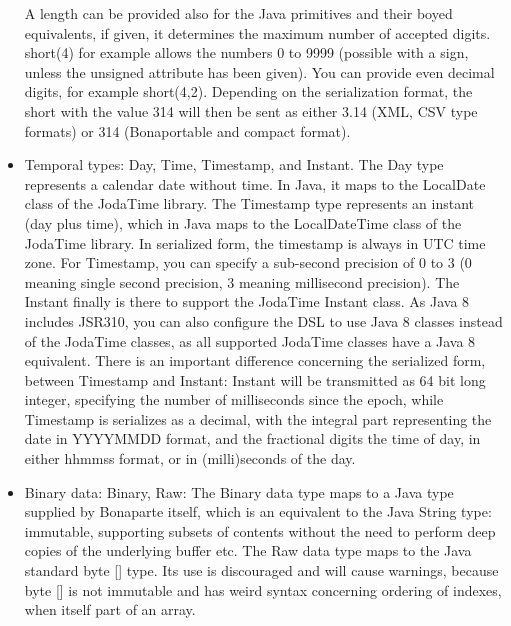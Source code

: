 \documentclass[11pt,a4paper,oneside]{article}
\begin{document}
\begin{itemize}
      A length can be provided also for the Java primitives and their boyed equivalents, if given, it determines the maximum
      number of accepted digits. {\ttfamily short(4)} for example allows the numbers 0 to 9999 (possible with a sign, unless
      the {\ttfamily unsigned} attribute has been given). You can provide even decimal digits, for example {\ttfamily
      short(4,2)}. Depending on the serialization format, the short with the value 314 will then be sent as either 3.14 (XML,
      CSV type formats) or 314 (Bonaportable and compact format).
  \item Temporal types: {\ttfamily Day}, {\ttfamily Time}, {\ttfamily Timestamp}, and {\ttfamily Instant}. The {\ttfamily Day}
  type represents a calendar date without time. In Java, it maps to the {\ttfamily LocalDate} class of the JodaTime library. The {\ttfamily Timestamp} type represents an instant (day plus time), which in Java maps   
    to the {\ttfamily LocalDateTime} class of the JodaTime library. In serialized form, the timestamp is always in UTC time zone. For {\ttfamily Timestamp},
    you can specify a sub-second precision of 0 to 3 (0 meaning single second precision, 3 meaning millisecond precision). 
    The {\ttfamily Instant} finally is there to support the JodaTime {\ttfamily Instant} class.
    As Java 8 includes JSR310, you can also configure the DSL to use Java 8 classes instead of the JodaTime classes, as all
    supported JodaTime classes have a Java 8 equivalent. There is an important difference concerning the serialized form,
    between {\ttfamily Timestamp} and {\ttfamily Instant}: {\ttfamily Instant} will be transmitted as 64 bit long integer,
    specifying the number of milliseconds since the epoch, while {\ttfamily Timestamp} is serializes as a decimal, with the
    integral part representing the date in YYYYMMDD format, and the fractional digits the time of day, in either hhmmss
    format, or in (milli)seconds of the day.
  \item Binary data: {\ttfamily Binary}, {\ttfamily Raw}: The {\ttfamily Binary} data type maps to a Java type supplied by Bonaparte itself, which is an
    equivalent to the Java {\ttfamily String} type: immutable, supporting subsets of contents without the need to perform deep copies of the underlying buffer etc.
    The {\ttfamily Raw} data type maps to the Java standard {\ttfamily byte []} type. Its use is discouraged and will cause warnings, because
    {\ttfamily byte []} is not immutable and has weird syntax concerning ordering of indexes, when itself part of an array.

\end{itemize}
\end{document}
